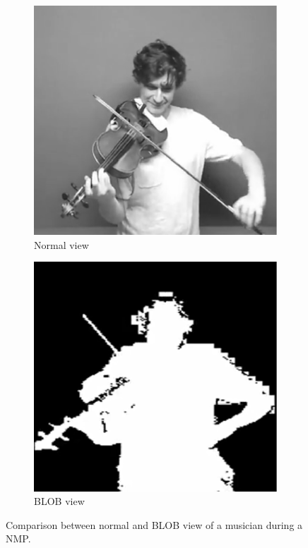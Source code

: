 \documentclass[conference]{IEEEtran}
\begin{document}
\begin{figure}[t]
	\centering
	\begin{subfigure}[t]{.46\columnwidth}
		\centering        
		\includegraphics[trim={0cm 0cm 0cm 0cm},clip,width=\textwidth]{img/webcam}
		\caption{Normal view}
		\label{subfig:webcam}
	\end{subfigure}
	\quad
	\begin{subfigure}[t]{.46\columnwidth}
		\centering        
		\includegraphics[trim={0cm 0cm 0cm 0cm},clip,width=\textwidth]{img/blob}
		\caption{BLOB view}
		\label{subfig:blob}
	\end{subfigure}
	\quad 
	\caption{Comparison between normal and BLOB view of a musician during a NMP.}\label{fig:wb}
\end{figure}  
\end{document}
